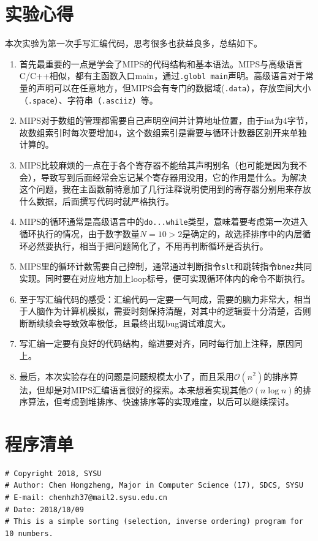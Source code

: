 \documentclass[12pt,UTF8]{ctexart}
\begin{document}
\begin{spacing}{1.1}
\section{实验心得}
本次实验为第一次手写汇编代码，思考很多也获益良多，总结如下。
\begin{enumerate}
	\item 首先最重要的一点是学会了MIPS的代码结构和基本语法。MIPS与高级语言C/C++相似，都有主函数入口main，通过\verb'.globl main'声明。高级语言对于常量的声明可以在任意地方，但MIPS会有专门的数据域(\verb'.data'），存放空间大小（\verb'.space'）、字符串（\verb'.asciiz'）等。
	\item MIPS对于数组的管理都需要自己声明空间并计算地址位置，由于int为4字节，故数组索引时每次要增加4，这个数组索引是需要与循环计数器区别开来单独计算的。
	\item MIPS比较麻烦的一点在于各个寄存器不能给其声明别名（也可能是因为我不会），导致写到后面经常会忘记某个寄存器用没用，它的作用是什么。为解决这个问题，我在主函数前特意加了几行注释说明使用到的寄存器分别用来存放什么数据，后面撰写代码时就严格执行。
	\item MIPS的循环通常是高级语言中的\verb'do...while'类型，意味着要考虑第一次进入循环执行的情况，由于数字数量$N=10>2$是确定的，故选择排序中的内层循环必然要执行，相当于把问题简化了，不用再判断循环是否执行。
	\item MIPS里的循环计数需要自己控制，通常通过判断指令\verb'slt'和跳转指令\verb'bnez'共同实现。同时要在对应地方加上loop标号，便可实现循环体内的命令不断执行。
	\item 至于写汇编代码的感受：汇编代码一定要一气呵成，需要的脑力非常大，相当于人脑作为计算机模拟，需要时刻保持清醒，对其中的逻辑要十分清楚，否则断断续续会导致效率极低，且最终出现bug调试难度大。
	\item 写汇编一定要有良好的代码结构，缩进要对齐，同时每行加上注释，原因同上。
	\item 最后，本次实验存在的问题是问题规模太小了，而且采用$\mathcal{O}(n^2)$的排序算法，但却是对MIPS汇编语言很好的探索。本来想着实现其他$\mathcal{O}(n\log n)$的排序算法，但考虑到堆排序、快速排序等的实现难度，以后可以继续探讨。
\end{enumerate}

\section{程序清单}
\label{sec:program}
\begin{lstlisting}
# Copyright 2018, SYSU
# Author: Chen Hongzheng, Major in Computer Science (17), SDCS, SYSU
# E-mail: chenhzh37@mail2.sysu.edu.cn
# Date: 2018/10/09
# This is a simple sorting (selection, inverse ordering) program for 10 numbers.


\end{lstlisting}
\end{spacing}
\end{document}

